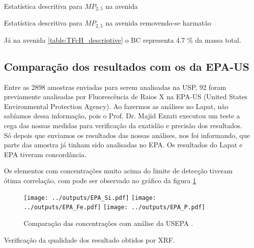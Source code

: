 \begin{table}[H]
  \centering
    
  \caption{Estatística descritiva para $MP_{2,5}$ na avenida
            \label{table:TFcH_descriptive}}
\end{table}

\begin{table}[H]
  \centering
    
  \caption{Estatística descritiva para $MP_{2,5}$ na avenida
           removendo-se harmatão \label{table:TFsH_descriptive}}
\end{table}


Já na avenida \ref{table:TFcH_descriptive} o BC
representa 4.7 \% da massa total.

%    

\subsection{Comparação dos resultados com os da EPA-US}

Entre as 2898 amostras enviadas para serem analisadas na USP, 92 foram previamente 
analisadas por Fluorescência de Raios X na EPA-US
(United States Environmental Protection Agency). 
Ao fazermos as análises no Lapat, não sabíamos
dessa informação, pois o Prof. Dr. Majid Ezzati executou um teste a cega das 
nossas medidas para verificação da exatidão e precisão dos resultados. 
Só depois que enviamos os resultados das nossas análises, nos foi informando, 
que parte das amostra já tinham sido analisadas no EPA. Os resultados do Lapat
e EPA tiveram concordância. 

Os elementos com concentrações muito acima do limite de detecção tiveram ótima
correlação, com pode ser observado no gráfico da figura \ref{fig:epa} 

\begin{figure}[H]
  \centering
    \texttt{[image: ../outputs/EPA\_Si.pdf]}
    \texttt{[image: ../outputs/EPA\_Fe.pdf]}
    \texttt{[image: ../outputs/EPA\_P.pdf]}
  \caption{Comparação das concentrações com análise da USEPA \label{fig:epa}.}
\end{figure}

Verificação da qualidade dos resultado obtidos por XRF.
